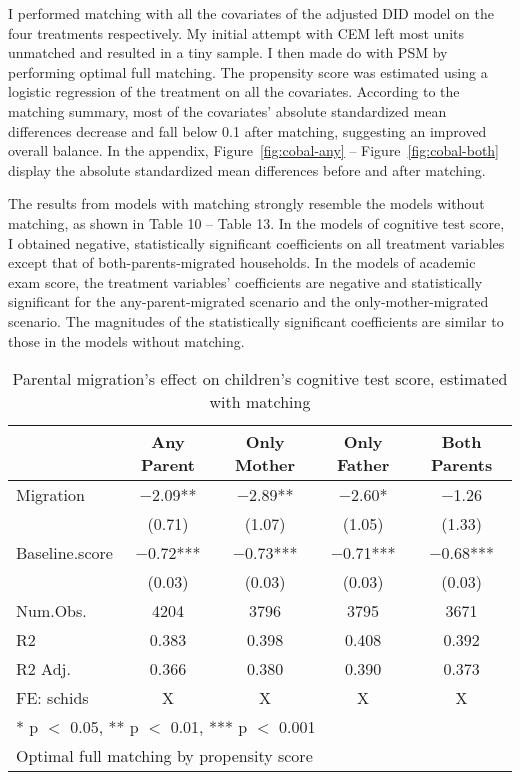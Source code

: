 \documentclass[
  man]{apa7}
\begin{document}
I performed matching with all the covariates of the adjusted DID model on the four treatments respectively. My initial attempt with CEM left most units unmatched and resulted in a tiny sample. I then made do with PSM by performing optimal full matching. The propensity score was estimated using a logistic regression of the treatment on all the covariates. According to the matching summary, most of the covariates' absolute standardized mean differences decrease and fall below 0.1 after matching, suggesting an improved overall balance. In the appendix, Figure~\ref{fig:cobal-any} -- Figure~\ref{fig:cobal-both} display the absolute standardized mean differences before and after matching.

The results from models with matching strongly resemble the models without matching, as shown in Table 10 -- Table 13. In the models of cognitive test score, I obtained negative, statistically significant coefficients on all treatment variables except that of both-parents-migrated households. In the models of academic exam score, the treatment variables' coefficients are negative and statistically significant for the any-parent-migrated scenario and the only-mother-migrated scenario. The magnitudes of the statistically significant coefficients are similar to those in the models without matching.

\begin{table}

\caption{Parental migration’s effect on children’s cognitive test score, estimated with matching}
\centering
\begin{tabular}[t]{lcccc}
\toprule
  & Any Parent & Only Mother & Only Father & Both Parents\\
\midrule
Migration & \num{-2.09}** & \num{-2.89}** & \num{-2.60}* & \num{-1.26}\\
 & (\num{0.71}) & (\num{1.07}) & (\num{1.05}) & (\num{1.33})\\
Baseline.score & \num{-0.72}*** & \num{-0.73}*** & \num{-0.71}*** & \num{-0.68}***\\
 & (\num{0.03}) & (\num{0.03}) & (\num{0.03}) & (\num{0.03})\\
\midrule
Num.Obs. & \num{4204} & \num{3796} & \num{3795} & \num{3671}\\
R2 & \num{0.383} & \num{0.398} & \num{0.408} & \num{0.392}\\
R2 Adj. & \num{0.366} & \num{0.380} & \num{0.390} & \num{0.373}\\
FE: schids & X & X & X & X\\
\bottomrule
\multicolumn{5}{l}{\rule{0pt}{1em}* p $<$ 0.05, ** p $<$ 0.01, *** p $<$ 0.001}\\
\multicolumn{5}{l}{\rule{0pt}{1em}Optimal full matching by propensity score}\\
\end{tabular}
\end{table}
\end{document}
